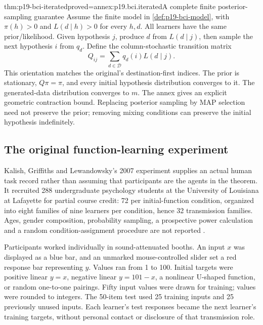 \begin{hbtheorem}{thm:p19-bci-iterated}{proved=annex:p19.bci.iterated}{A complete finite posterior-sampling guarantee}
Assume the finite model in \cref{def:p19-bci-model}, with
\(\pi(h)>0\) and \(L(d\mid h)>0\) for every \(h,d\).
All learners have the same prior/likelihood. Given hypothesis \(j\),
produce \(d\) from \(L(d\mid j)\), then sample the next hypothesis
\(i\) from \(q_d\). Define the column-stochastic transition matrix
\[
 Q_{ij}=\sum_{d\in\mathcal D}q_d(i)L(d\mid j).
\]
This orientation matches the original's destination-first indices.
The prior is stationary, \(Q\pi=\pi\), and every initial hypothesis
distribution converges to it. The generated-data distribution converges
to \(m\). The annex gives an explicit geometric contraction bound.
Replacing posterior sampling by MAP selection need not preserve the prior;
removing mixing conditions can preserve the initial hypothesis indefinitely.
\end{hbtheorem}

\subsection{The original function-learning experiment}

Kalish, Griffiths and Lewandowsky's 2007 experiment supplies an actual
human task record rather than assuming that participants are the agents
in the theorem. It recruited 288 undergraduate psychology students at the
University of Louisiana at Lafayette for partial course credit: 72 per
initial-function condition, organized into eight families of nine learners
per condition, hence 32 transmission families. Ages, gender composition,
probability sampling, a prospective power calculation and a random
condition-assignment procedure are not reported
\cite[pp.~290--291]{KalishGriffithsLewandowsky2007Iterated}.

Participants worked individually in sound-attenuated booths. An input
\(x\) was displayed as a blue bar, and an unmarked mouse-controlled
slider set a red response bar representing \(y\). Values ran from 1
to 100. Initial targets were positive linear \(y=x\), negative linear
\(y=101-x\), a nonlinear U-shaped function, or random one-to-one
pairings. Fifty input values were drawn for training; values were rounded
to integers. The 50-item test used 25 training inputs and 25 previously
unused inputs. Each learner's test responses became the next learner's
training targets, without personal contact or disclosure of that transmission
role.

